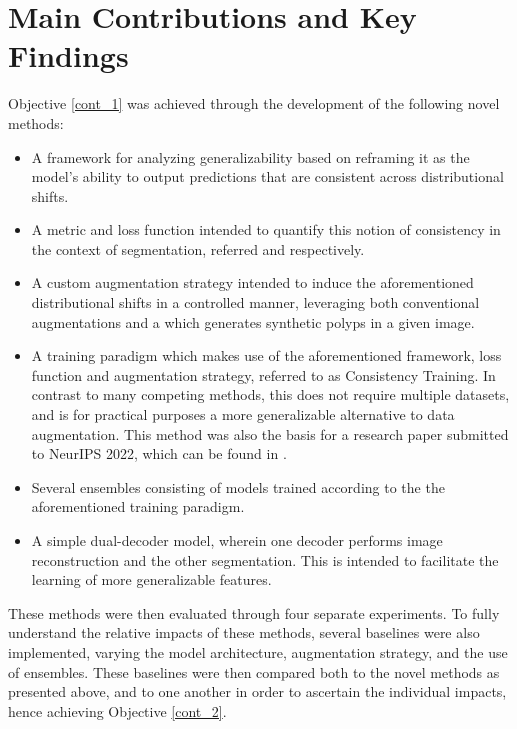     \section{Main Contributions and Key Findings}
    Objective \ref{cont_1} was achieved through the development of the following novel methods:
    \begin{itemize}
        \item A framework for analyzing generalizability based on reframing it as the model's ability to output predictions that are consistent across distributional shifts.
        \item A metric and loss function intended to quantify this notion of consistency in the context of segmentation, referred  and  respectively.
        \item A custom augmentation strategy intended to induce the aforementioned distributional shifts in a controlled manner, leveraging both conventional augmentations and a  which generates synthetic polyps in a given image. 
        \item A training paradigm which makes use of the aforementioned framework, loss function and augmentation strategy, referred to as Consistency Training. In contrast to many competing methods, this does not require multiple datasets, and is for practical purposes a more generalizable alternative to data augmentation. This method was also the basis for a research paper submitted to NeurIPS 2022, which can be found in .
        \item Several ensembles consisting of models trained according to the the aforementioned training paradigm.
        \item A simple dual-decoder model, wherein one decoder performs image reconstruction and the other segmentation. This is intended to facilitate the learning of more generalizable features.
    \end{itemize}
    
    These methods were then evaluated through four separate experiments. To fully understand the relative impacts of these methods, several baselines were also implemented, varying the model architecture, augmentation strategy, and the use of ensembles. These baselines were then compared both to the novel methods as presented above, and to one another in order to ascertain the individual impacts, hence achieving Objective \ref{cont_2}.
    
